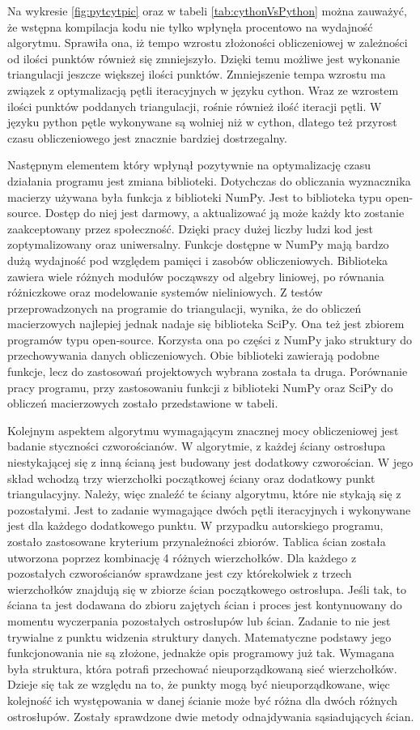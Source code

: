 Na wykresie \ref{fig:pytcytpic} oraz w tabeli \ref{tab:cythonVsPython} można zauważyć, że wstępna kompilacja kodu nie tylko wpłynęła procentowo na wydajność algorytmu. Sprawiła ona, iż tempo wzrostu złożoności obliczeniowej w zależności od ilości punktów również się zmniejszyło. Dzięki temu możliwe jest wykonanie triangulacji jeszcze większej ilości punktów. Zmniejszenie tempa wzrostu ma związek z optymalizacją pętli iteracyjnych w języku cython. Wraz ze wzrostem ilości punktów poddanych triangulacji, rośnie również ilość iteracji pętli. W języku python pętle wykonywane są wolniej niż w cython, dlatego też przyrost czasu obliczeniowego jest znacznie bardziej dostrzegalny.

Następnym elementem który wpłynął pozytywnie na optymalizację czasu działania programu jest zmiana biblioteki. Dotychczas do obliczania wyznacznika macierzy używana była funkcja z biblioteki NumPy. Jest to biblioteka typu open-source. Dostęp do niej jest darmowy, a aktualizować ją może każdy kto zostanie zaakceptowany przez społeczność. Dzięki pracy dużej liczby ludzi kod jest zoptymalizowany oraz uniwersalny. Funkcje dostępne w NumPy mają bardzo dużą wydajność pod względem pamięci i zasobów obliczeniowych. Biblioteka zawiera wiele różnych modułów począwszy od algebry liniowej, po równania różniczkowe oraz modelowanie systemów nieliniowych. Z testów przeprowadzonych na programie do triangulacji, wynika, że do obliczeń macierzowych najlepiej jednak nadaje się biblioteka SciPy. Ona też jest zbiorem programów typu open-source. Korzysta ona po części z NumPy jako struktury do przechowywania danych obliczeniowych. Obie biblioteki zawierają podobne funkcje, lecz do zastosowań projektowych wybrana została ta druga. Porównanie pracy programu, przy zastosowaniu funkcji z biblioteki NumPy oraz SciPy do obliczeń macierzowych zostało przedstawione w tabeli.

Kolejnym aspektem algorytmu wymagającym znacznej mocy obliczeniowej jest badanie styczności czworościanów. W algorytmie, z każdej ściany ostrosłupa niestykającej się z inną ścianą jest budowany jest dodatkowy czworościan. W jego skład wchodzą trzy wierzchołki początkowej ściany oraz dodatkowy punkt triangulacyjny. Należy, więc znaleźć te ściany algorytmu, które nie stykają się z pozostałymi. Jest to zadanie wymagające dwóch pętli iteracyjnych i wykonywane jest dla każdego dodatkowego punktu. W przypadku autorskiego programu, zostało zastosowane kryterium przynależności zbiorów. Tablica ścian została utworzona poprzez kombinację 4 różnych wierzchołków. Dla każdego z pozostałych czworościanów sprawdzane jest czy którekolwiek z trzech wierzchołków znajdują się w zbiorze ścian początkowego ostrosłupa. Jeśli tak, to ściana ta jest dodawana do zbioru zajętych ścian i proces jest kontynuowany do momentu wyczerpania pozostałych ostrosłupów lub ścian. Zadanie to nie jest trywialne z punktu widzenia struktury danych. Matematyczne podstawy jego funkcjonowania nie są złożone, jednakże opis programowy już tak. Wymagana była struktura, która potrafi przechować nieuporządkowaną sieć wierzchołków. Dzieje się tak ze względu na to, że punkty mogą być nieuporządkowane, więc kolejność ich występowania w danej ścianie może być różna dla dwóch różnych ostrosłupów. Zostały sprawdzone dwie metody odnajdywania sąsiadujących ścian.

